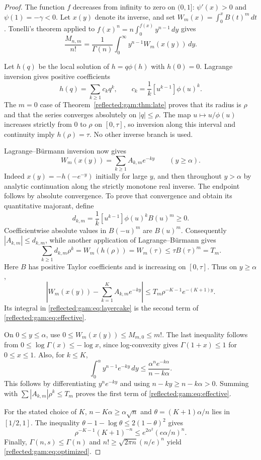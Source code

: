 \begin{proof}
The function $f$ decreases from infinity to zero on $(0,1]$:
$\psi'(x)>0$ and $\psi(1)=-\gamma<0$.  Let $x(y)$ denote its inverse,
and set $W_m(x)=\int_0^x B(t)^m\,dt$.  Tonelli's theorem applied to
$f(x)^n=n\int_0^{f(x)}y^{n-1}\,dy$ gives
\begin{equation}\label{reflected:gam:eq:layercake}
 \frac{M_{n,m}}{n!}
 =\frac1{\Gamma(n)}\int_0^\infty y^{n-1}W_m(x(y))\,dy.
\end{equation}

Let $h(q)$ be the local solution of $h=q\phi(h)$ with $h(0)=0$.
Lagrange inversion gives positive coefficients
\[
 h(q)=\sum_{k\ge1}c_kq^k,
 \qquad c_k=\frac1k[u^{k-1}]\phi(u)^k.
\]
The $m=0$ case of Theorem~\ref{reflected:gam:thm:late} proves that its radius
is $\rho$ and that the series converges absolutely on $|q|\le\rho$.
The map $u\mapsto u/\phi(u)$ increases strictly from $0$ to $\rho$
on $[0,\tau]$, so inversion along this interval and continuity imply
$h(\rho)=\tau$.  No other inverse branch is used.

Lagrange--B\"urmann inversion now gives
\[
 W_m(x(y))=\sum_{k\ge1}A_{k,m}e^{-ky}
 \qquad(y\ge\alpha).
\]
Indeed $x(y)=-h(-e^{-y})$ initially for large $y$, and then throughout
$y>\alpha$ by analytic continuation along the strictly monotone real
inverse.  The endpoint follows by absolute convergence.  To prove that
convergence and obtain its quantitative majorant, define
\[
 d_{k,m}=\frac1k[u^{k-1}]\phi(u)^k B(u)^m\ge0.
\]
Coefficientwise absolute values in $B(-u)^m$ are $B(u)^m$.
Consequently $|A_{k,m}|\le d_{k,m}$, while another application of
Lagrange--B\"urmann gives
\[
 \sum_{k\ge1}d_{k,m}\rho^k=W_m(h(\rho))=W_m(\tau)
 \le\tau B(\tau)^m=T_m.
\]
Here $B$ has positive Taylor coefficients and is increasing on $[0,\tau]$.
Thus on $y\ge\alpha$,
\[
 \left|W_m(x(y))-\sum_{k=1}^K A_{k,m}e^{-ky}\right|
 \le T_m\rho^{-K-1}e^{-(K+1)y}.
\]
Its integral in \eqref{reflected:gam:eq:layercake} is the second term of
\eqref{reflected:gam:eq:effective}.

On $0\le y\le\alpha$, use $0\le W_m(x(y))\le M_{m,0}\le m!$.
The last inequality follows from
$0\le\log\Gamma(x)\le-\log x$, since log-convexity gives
$\Gamma(1+x)\le1$ for $0\le x\le1$.  Also, for $k\le K$,
\[
 \int_0^\alpha y^{n-1}e^{-ky}\,dy
 \le\frac{\alpha^n e^{-k\alpha}}{n-k\alpha}.
\]
This follows by differentiating $y^ne^{-ky}$ and using
$n-ky\ge n-k\alpha>0$.  Summing with
$\sum|A_{k,m}|\rho^k\le T_m$ proves the first term of
\eqref{reflected:gam:eq:effective}.

For the stated choice of $K$, $n-K\alpha\ge\alpha\sqrt n$ and
$\theta=(K+1)\alpha/n$ lies in $[1/2,1]$.
The inequality $\theta-1-\log\theta\le2(1-\theta)^2$ gives
\[
 \rho^{-K-1}(K+1)^{-n}
 \le e^{2\alpha^2}(e\alpha/n)^n.
\]
Finally, $\Gamma(n,s)\le\Gamma(n)$ and
$n!\ge\sqrt{2\pi n}(n/e)^n$ yield \eqref{reflected:gam:eq:optimized}.
\end{proof}

